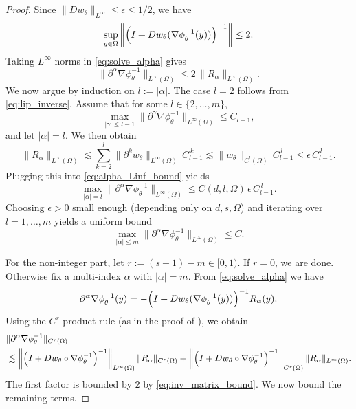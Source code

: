 \documentclass[10pt,a4paper]{amsart}
\begin{document}
\begin{proof}
Since $\|Dw_\theta\|_{L^\infty}\le\epsilon\le 1/2$, we have
\begin{equation}
\label{eq:inv_matrix_bound}
\sup_{y\in\Omega}\left\|\Bigl(I+Dw_\theta(\nabla\phi_\theta^{-1}(y))\Bigr)^{-1}\right\|
\le 2.
\end{equation}
Taking $L^\infty$ norms in \eqref{eq:solve_alpha} gives
\begin{equation}
\label{eq:alpha_Linf_bound}
\|\partial^\alpha \nabla\phi_\theta^{-1}\|_{L^\infty(\Omega)}
\le
2\,\|R_\alpha\|_{L^\infty(\Omega)}.
\end{equation}
We now argue by induction on $l:=|\alpha|$. The case $l=2$ follows from \eqref{eq:lip_inverse}.
Assume that for some $l\in\{2,\dots,m\}$,
\begin{equation}
\label{eq:induction_hyp}
\max_{|\gamma|\le l-1}\|\partial^\gamma \nabla\phi_\theta^{-1}\|_{L^\infty(\Omega)} \le C_{l-1},
\end{equation}
and let $|\alpha|=l$. We then obtain
\begin{equation}
\|R_\alpha\|_{L^\infty(\Omega)}
\lesssim
\sum_{k=2}^l
\|\partial^k w_\theta\|_{L^\infty(\Omega)}\,
C_{l-1}^{\,k}
\lesssim
\|w_\theta\|_{C^l(\Omega)}\,C_{l-1}^{\,l}
\le
\epsilon\,C_{l-1}^{\,l}.
\end{equation}
Plugging this into \eqref{eq:alpha_Linf_bound} yields
\begin{equation}
\max_{|\alpha|=l}\|\partial^\alpha \nabla\phi_\theta^{-1}\|_{L^\infty(\Omega)}
\le
C(d,l,\Omega)\,\epsilon\,C_{l-1}^{\,l}.
\end{equation}
Choosing $\epsilon>0$ small enough (depending only on $d,s,\Omega$) and iterating over $l=1,\dots,m$ yields a uniform bound
\begin{equation}
\label{eq:Cm_bound_inverse}
\max_{|\alpha|\le m}\|\partial^\alpha \nabla\phi_\theta^{-1}\|_{L^\infty(\Omega)} \le C.
\end{equation}

For the non-integer part, let
$
r := (s+1) - m \in [0,1).
$
If $r=0$, we are done. Otherwise fix a multi-index $\alpha$ with $|\alpha|=m$.
From \eqref{eq:solve_alpha} we have
\begin{equation}
\label{eq:alpha_product_clean}
\partial^\alpha \nabla\phi_\theta^{-1}(y)
=
-\Bigl(I + Dw_\theta(\nabla\phi_\theta^{-1}(y))\Bigr)^{-1} R_\alpha(y).
\end{equation}
Using the $C^r$ product rule (as in the proof of ), we obtain
\begin{equation}
\label{eq:Cr_product_bound}
\begin{aligned}
&\|\partial^\alpha \nabla\phi_\theta^{-1}\|_{C^r(\Omega)} \\
&\lesssim
\left\|\Bigl(I+Dw_\theta\circ\nabla\phi_\theta^{-1}\Bigr)^{-1}\right\|_{L^\infty(\Omega)}\|R_\alpha\|_{C^r(\Omega)}
+
\left\|\Bigl(I+Dw_\theta\circ\nabla\phi_\theta^{-1}\Bigr)^{-1}\right\|_{C^r(\Omega)}\|R_\alpha\|_{L^\infty(\Omega)}.
\end{aligned}
\end{equation}
The first factor is bounded by $2$ by \eqref{eq:inv_matrix_bound}. We now bound the remaining terms.


\end{proof}
\end{document}
